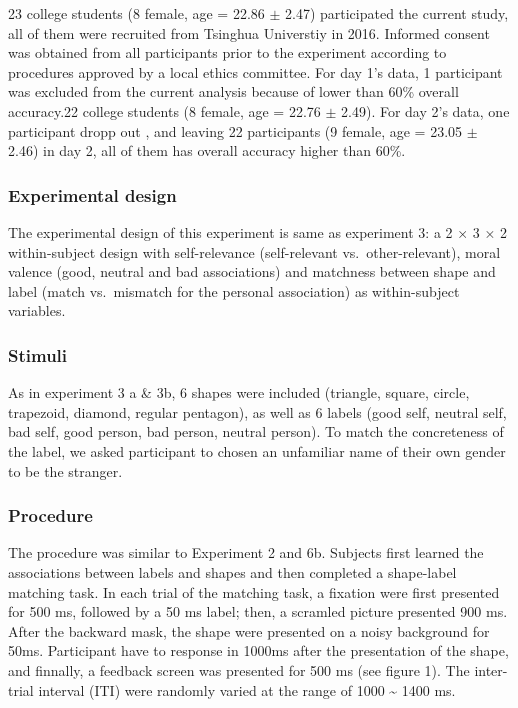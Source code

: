 \documentclass[man]{apa6}
\begin{document}
23 college students (8 female, age = 22.86 \(\pm\) 2.47) participated the current study, all of them were recruited from Tsinghua Universtiy in 2016. Informed consent was obtained from all participants prior to the experiment according to procedures approved by a local ethics committee. For day 1's data, 1 participant was excluded from the current analysis because of lower than 60\% overall accuracy.22 college students (8 female, age = 22.76 \(\pm\) 2.49). For day 2's data, one participant dropp out , and leaving 22 participants (9 female, age = 23.05 \(\pm\) 2.46) in day 2, all of them has overall accuracy higher than 60\%.

\hypertarget{experimental-design-4}{%
\subsubsection{Experimental design}\label{experimental-design-4}}

The experimental design of this experiment is same as experiment 3: a 2 × 3 × 2 within-subject design with self-relevance (self-relevant vs.~other-relevant), moral valence (good, neutral and bad associations) and matchness between shape and label (match vs.~mismatch for the personal association) as within-subject variables.

\hypertarget{stimuli-5}{%
\subsubsection{Stimuli}\label{stimuli-5}}

As in experiment 3 a \& 3b, 6 shapes were included (triangle, square, circle, trapezoid, diamond, regular pentagon), as well as 6 labels (good self, neutral self, bad self, good person, bad person, neutral person). To match the concreteness of the label, we asked participant to chosen an unfamiliar name of their own gender to be the stranger.

\hypertarget{procedure-10}{%
\subsubsection{Procedure}\label{procedure-10}}

The procedure was similar to Experiment 2 and 6b. Subjects first learned the associations between labels and shapes and then completed a shape-label matching task. In each trial of the matching task, a fixation were first presented for 500 ms, followed by a 50 ms label; then, a scramled picture presented 900 ms. After the backward mask, the shape were presented on a noisy background for 50ms. Participant have to response in 1000ms after the presentation of the shape, and finnally, a feedback screen was presented for 500 ms (see figure 1). The inter-trial interval (ITI) were randomly varied at the range of 1000 \textasciitilde{} 1400 ms.
\end{document}
